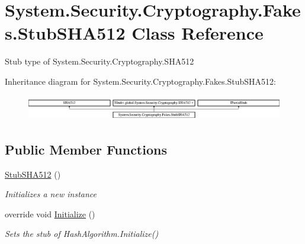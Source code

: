 \hypertarget{class_system_1_1_security_1_1_cryptography_1_1_fakes_1_1_stub_s_h_a512}{\section{System.\-Security.\-Cryptography.\-Fakes.\-Stub\-S\-H\-A512 Class Reference}
\label{class_system_1_1_security_1_1_cryptography_1_1_fakes_1_1_stub_s_h_a512}
}


Stub type of System.\-Security.\-Cryptography.\-S\-H\-A512 


Inheritance diagram for System.\-Security.\-Cryptography.\-Fakes.\-Stub\-S\-H\-A512\-:\begin{figure}[H]
\begin{center}
\leavevmode
\includegraphics[height=1.117764cm]{class_system_1_1_security_1_1_cryptography_1_1_fakes_1_1_stub_s_h_a512}
\end{center}
\end{figure}
\subsection*{Public Member Functions}
\begin{DoxyCompactItemize}
\item 
\hyperlink{class_system_1_1_security_1_1_cryptography_1_1_fakes_1_1_stub_s_h_a512_a97df5eaafe6821a48b47731258e8a162}{Stub\-S\-H\-A512} ()
\begin{DoxyCompactList}\small\item\em Initializes a new instance\end{DoxyCompactList}\item 
override void \hyperlink{class_system_1_1_security_1_1_cryptography_1_1_fakes_1_1_stub_s_h_a512_ac59bde587bc7d5279b7c7417f49d2815}{Initialize} ()
\begin{DoxyCompactList}\small\item\em Sets the stub of Hash\-Algorithm.\-Initialize()\end{DoxyCompactList}\end{DoxyCompactItemize}
